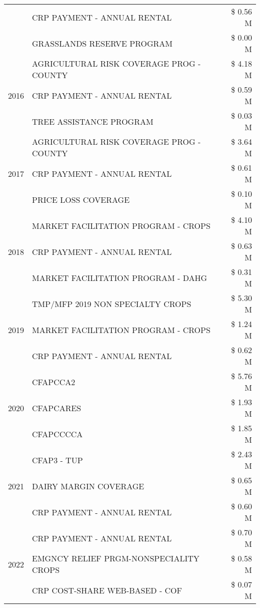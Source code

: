 \begin{tabular}{llr}
 & CRP PAYMENT - ANNUAL RENTAL & \$ 0.56 M \\
 & GRASSLANDS RESERVE PROGRAM & \$ 0.00 M \\
\cline{1-3}
\multirow[t]{3}{*}{2016} & AGRICULTURAL RISK COVERAGE PROG - COUNTY & \$ 4.18 M \\
 & CRP PAYMENT - ANNUAL RENTAL & \$ 0.59 M \\
 & TREE ASSISTANCE PROGRAM & \$ 0.03 M \\
\cline{1-3}
\multirow[t]{3}{*}{2017} & AGRICULTURAL RISK COVERAGE PROG - COUNTY & \$ 3.64 M \\
 & CRP PAYMENT - ANNUAL RENTAL & \$ 0.61 M \\
 & PRICE LOSS COVERAGE & \$ 0.10 M \\
\cline{1-3}
\multirow[t]{3}{*}{2018} & MARKET FACILITATION PROGRAM - CROPS & \$ 4.10 M \\
 & CRP PAYMENT - ANNUAL RENTAL & \$ 0.63 M \\
 & MARKET FACILITATION PROGRAM - DAHG & \$ 0.31 M \\
\cline{1-3}
\multirow[t]{3}{*}{2019} & TMP/MFP 2019 NON SPECIALTY CROPS & \$ 5.30 M \\
 & MARKET FACILITATION PROGRAM - CROPS & \$ 1.24 M \\
 & CRP PAYMENT - ANNUAL RENTAL & \$ 0.62 M \\
\cline{1-3}
\multirow[t]{3}{*}{2020} & CFAPCCA2 & \$ 5.76 M \\
 & CFAPCARES & \$ 1.93 M \\
 & CFAPCCCCA & \$ 1.85 M \\
\cline{1-3}
\multirow[t]{3}{*}{2021} & CFAP3 - TUP & \$ 2.43 M \\
 & DAIRY MARGIN COVERAGE & \$ 0.65 M \\
 & CRP PAYMENT - ANNUAL RENTAL & \$ 0.60 M \\
\cline{1-3}
\multirow[t]{3}{*}{2022} & CRP PAYMENT - ANNUAL RENTAL & \$ 0.70 M \\
 & EMGNCY RELIEF PRGM-NONSPECIALITY CROPS & \$ 0.58 M \\
 & CRP COST-SHARE WEB-BASED - COF & \$ 0.07 M \\
\cline{1-3}
\bottomrule
\end{tabular}
